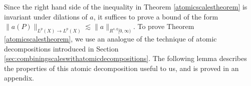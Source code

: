 %

%
%
%
%
%
%

Since the right hand side of the inequality in Theorem \ref{atomicscalestheorem} is invariant under dilations of $a$, it suffices to prove a bound of the form $\| a(P) \|_{L^p(X) \to L^p(X)} \lesssim \| a \|_{R^{s,q}[0,\infty)}$. To prove Theorem \ref{atomicscalestheorem}, we use an analogue of the technique of atomic decompositions introduced in Section \ref{sec:combiningscaleswithatomicdecompositions}. The following lemma describes the properties of this atomic decomposition useful to us, and is proved in an appendix.

